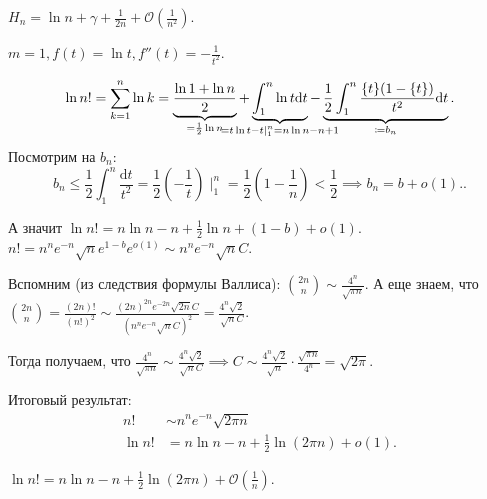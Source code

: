 \begin{remark}
    $H_n = \ln n + \gamma + \frac{1}{2n} + \mathcal{O}(\frac{1}{n^2})$.
\end{remark}
\begin{example}
    $m = 1, f(t) = \ln t, f''(t) = -\frac{1}{t^2}$.

    \[
        \ln n! = \sum_{k=1}^n \ln k = \underbrace{\frac{\ln 1 + \ln n}{2}}_{= \frac{1}{2} \ln n} + \underbrace{\int_1^n \ln t \mathrm{d}t}_{\mathclap{=t\ln t-t\mid_1^n = n\ln n - n + 1}} - \underbrace{\frac{1}{2} \int_1^n \frac{\{t\}(1-\{t\})}{t^2} \mathrm{d}t}_{\coloneqq b_n}
    .\] 
    Посмотрим на $b_n$:  \[
        b_n \le \frac{1}{2} \int_1^n \frac{\mathrm{d}t}{t^2} = \frac{1}{2} (-\frac{1}{t}) \mid_1^n = \frac{1}{2} (1-\frac{1}{n}) < \frac{1}{2} \implies b_n = b + o(1).
    .\] 

    А значит $\ln n! = n \ln n - n + \frac{1}{2} \ln n + (1-b) + o(1)$.
    $n! = n^n e^{-n} \sqrt{n} e^{1-b} e^{o(1)} \sim n^n e^{-n} \sqrt{n} C$.

    Вспомним (из следствия формулы Валлиса): $\binom{2n}{n} \sim \frac{4^n}{\sqrt{\pi n}}$. А еще знаем, что $\binom{2n}{n} = \frac{(2n)!}{(n!)^2} \sim \frac{(2n)^{2n}e^{-2n}\sqrt{2n}C}{(n^n e^{-n}\sqrt{n}C)^2} = \frac{4^n \sqrt{2}}{\sqrt{n}C}$.

    Тогда получаем, что $\frac{4^n}{\sqrt{\pi n}} \sim \frac{4^n \sqrt{2}}{\sqrt{n}C} \implies C \sim \frac{4^n \sqrt{2}}{\sqrt{n}} \cdot \frac{\sqrt{\pi n}}{4^n} = \sqrt{2\pi}$.

    Итоговый результат: \begin{align*}
        n! &\sim n^n e^{-n} \sqrt{2\pi n}\\
        \ln n! &= n \ln n - n + \frac{1}{2} \ln (2\pi n) + o(1)
    .\end{align*}
\end{example}
\begin{remark}
    $\ln n! = n \ln n - n + \frac{1}{2} \ln(2 \pi n) + \mathcal{O}(\frac{1}{n})$.
\end{remark}
